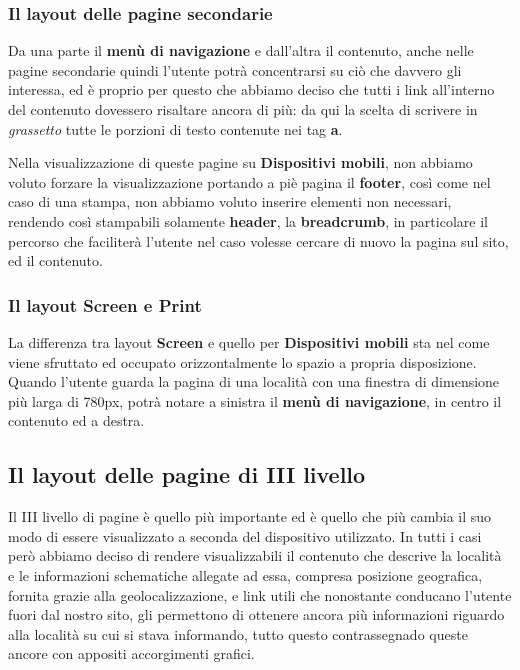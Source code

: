 \subsubsection{Il layout delle pagine secondarie}\label{sec:Pres-IIliv-sec}
Da una parte il \textbf{menù di navigazione} e dall'altra il contenuto, anche
nelle pagine secondarie quindi l'utente potrà concentrarsi su ciò che davvero
gli interessa, ed è proprio per questo che abbiamo deciso che tutti i link
all'interno del contenuto dovessero risaltare ancora di più: da qui la scelta
di scrivere in \textit{grassetto} tutte le porzioni di testo contenute nei tag
\textbf{a}.

Nella visualizzazione di queste pagine su \textbf{Dispositivi mobili}, non
abbiamo voluto forzare la visualizzazione portando a piè pagina il
\textbf{footer}, così come nel caso di una stampa, non abbiamo voluto inserire
elementi non necessari, rendendo così stampabili solamente \textbf{header},
la \textbf{breadcrumb}, in particolare il percorso che faciliterà l'utente nel
caso volesse cercare di nuovo la pagina sul sito, ed il contenuto.

\subsubsection{Il layout Screen e Print}\label{sec:Pres-IIliv-screenPrint}
La differenza tra layout \textbf{Screen} e quello per \textbf{Dispositivi
mobili} sta nel come viene sfruttato ed occupato orizzontalmente lo spazio a
propria disposizione.
Quando l'utente guarda la pagina di una località con una finestra di
dimensione più larga di 780px, potrà notare a sinistra il \textbf{menù di
navigazione}, in centro il contenuto ed a destra.

\subsection{Il layout delle pagine di III livello}\label{sec:Pres-IIIliv}
Il III livello di pagine è quello più importante ed è quello che più cambia il
suo modo di essere visualizzato a seconda del dispositivo utilizzato.
In tutti i casi però abbiamo deciso di rendere visualizzabili il contenuto che
descrive la località e le informazioni schematiche allegate ad essa, compresa
posizione geografica, fornita grazie alla geolocalizzazione, e link utili che
nonostante conducano l'utente fuori dal nostro sito, gli permettono di
ottenere ancora più informazioni riguardo alla località su cui si stava
informando, tutto questo contrassegnado queste ancore con appositi
accorgimenti grafici.

